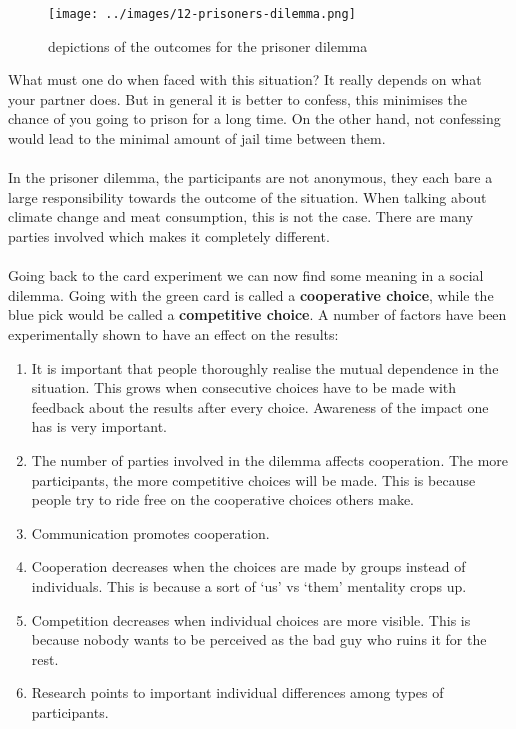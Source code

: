 \documentclass[../summary.tex]{subfiles}
\begin{document}
\begin{figure}[h]
	\centering
	\texttt{[image: ../images/12-prisoners-dilemma.png]}
	\caption{depictions of the outcomes for the prisoner dilemma}
	\label{fig:prisoners-dilemma}
\end{figure}
What must one do when faced with this situation? It really depends on what your partner does. But in general it is better to confess, this minimises the chance of you going to prison for a long time. On the other hand, not confessing would lead to the minimal amount of jail time between them.
\\\\
In the prisoner dilemma, the participants are not anonymous, they each bare a large responsibility towards the outcome of the situation. When talking about climate change and meat consumption, this is not the case. There are many parties involved which makes it completely different.
\\\\
\newpage
Going back to the card experiment we can now find some meaning in a social dilemma. Going with the green card is called a \textbf{cooperative choice}, while the blue pick would be called a \textbf{competitive choice}. A number of factors have been experimentally shown to have an effect on the results:
\begin{enumerate}
	\item It is important that people thoroughly realise the mutual dependence in the situation. This grows when consecutive choices have to be made with feedback about the results after every choice. Awareness of the impact one has is very important.
	\item The number of parties involved in the dilemma affects cooperation. The more participants, the more competitive choices will be made. This is because people try to ride free on the cooperative choices others make.
	\item Communication promotes cooperation.
	\item Cooperation decreases when the choices are made by groups instead of individuals. This is because a sort of `us' vs `them' mentality crops up.
	\item Competition decreases when individual choices are more visible. This is because nobody wants to be perceived as the bad guy who ruins it for the rest.
	\item Research points to important individual differences among types of participants.
\end{enumerate}
\newpage
\end{document}
